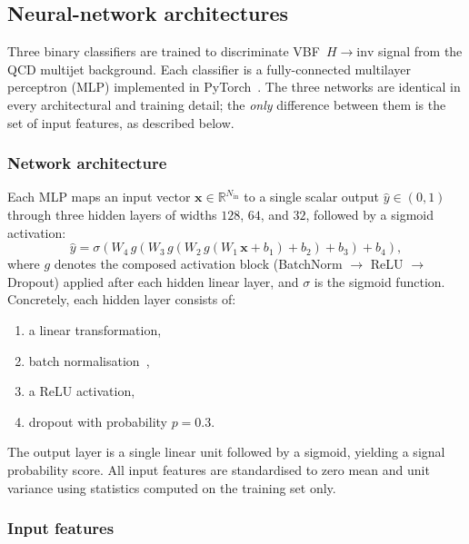 
\subsection{Neural-network architectures}
\label{sec:nn_arch}

Three binary classifiers are trained to discriminate VBF~$H\!\to\!\text{inv}$ signal
from the QCD multijet background.
Each classifier is a fully-connected multilayer perceptron (MLP) implemented in
PyTorch~\cite{pytorch}.
The three networks are identical in every architectural and training detail;
the \emph{only} difference between them is the set of input features, as
described below.

\subsubsection*{Network architecture}

Each MLP maps an input vector $\mathbf{x}\in\mathbb{R}^{N_\text{in}}$ to a
single scalar output $\hat{y}\in(0,1)$ through three hidden layers of widths
$128$, $64$, and $32$, followed by a sigmoid activation:
%
\begin{equation}
  \hat{y} = \sigma\!\left(
    W_4\,g\!\left(W_3\,g\!\left(W_2\,g\!\left(W_1\,\mathbf{x}+b_1\right)+b_2\right)+b_3\right)+b_4
  \right),
\end{equation}
%
where $g$ denotes the composed activation block (BatchNorm $\to$ ReLU $\to$
Dropout) applied after each hidden linear layer, and $\sigma$ is the sigmoid
function.
Concretely, each hidden layer consists of:
%
\begin{enumerate}
  \item a linear transformation,
  \item batch normalisation~\cite{batchnorm},
  \item a ReLU activation,
  \item dropout with probability $p=0.3$.
\end{enumerate}
%
The output layer is a single linear unit followed by a sigmoid, yielding a
signal probability score.
All input features are standardised to zero mean and unit variance using
statistics computed on the training set only.

\subsubsection*{Input features}


